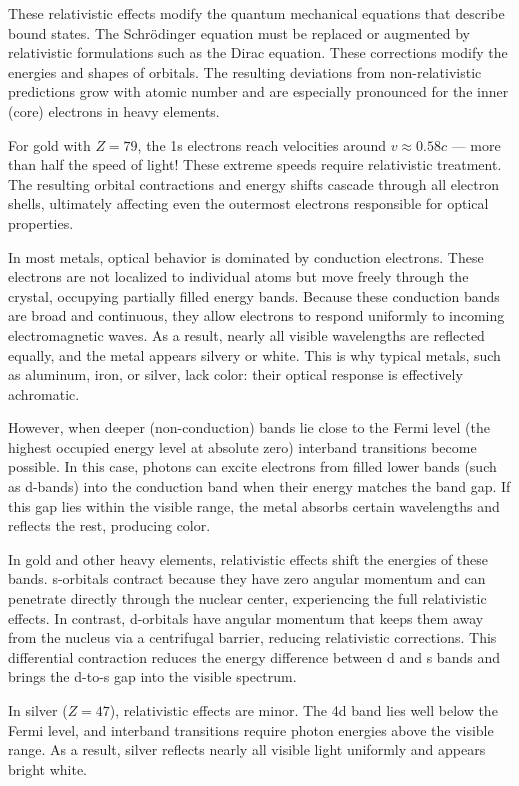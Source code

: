These relativistic effects modify the quantum mechanical equations that describe bound states. The Schrödinger equation must be replaced or augmented by relativistic formulations such as the Dirac equation. These corrections modify the energies and shapes of orbitals. The resulting deviations from non-relativistic predictions grow with atomic number and are especially pronounced for the inner (core) electrons in heavy elements.

For gold with $Z = 79$, the 1s electrons reach velocities around $v \approx 0.58c$ — more than half the speed of light! These extreme speeds require relativistic treatment. The resulting orbital contractions and energy shifts cascade through all electron shells, ultimately affecting even the outermost electrons responsible for optical properties.

In most metals, optical behavior is dominated by conduction electrons. These electrons are not localized to individual atoms but move freely through the crystal, occupying partially filled energy bands. Because these conduction bands are broad and continuous, they allow electrons to respond uniformly to incoming electromagnetic waves. As a result, nearly all visible wavelengths are reflected equally, and the metal appears silvery or white. This is why typical metals, such as aluminum, iron, or silver, lack color: their optical response is effectively achromatic.

However, when deeper (non-conduction) bands lie close to the Fermi level (the highest occupied energy level at absolute zero) interband transitions become possible. In this case, photons can excite electrons from filled lower bands (such as d-bands) into the conduction band when their energy matches the band gap. If this gap lies within the visible range, the metal absorbs certain wavelengths and reflects the rest, producing color.

In gold and other heavy elements, relativistic effects shift the energies of these bands. s-orbitals contract because they have zero angular momentum and can penetrate directly through the nuclear center, experiencing the full relativistic effects. In contrast, d-orbitals have angular momentum that keeps them away from the nucleus via a centrifugal barrier, reducing relativistic corrections. This differential contraction reduces the energy difference between d and s bands and brings the d-to-s gap into the visible spectrum.

In silver ($Z = 47$), relativistic effects are minor. The 4d band lies well below the Fermi level, and interband transitions require photon energies above the visible range. As a result, silver reflects nearly all visible light uniformly and appears bright white.

